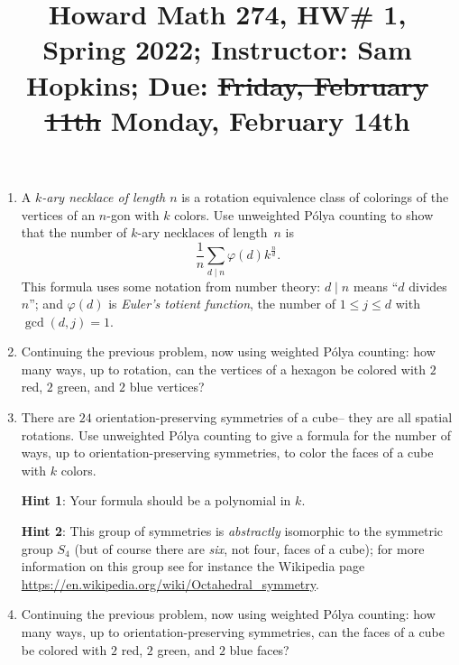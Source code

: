 \documentclass[11pt]{article}
\title{Howard Math 274, HW\# 1, \\ {\normalsize Spring 2022; Instructor: Sam Hopkins; Due: \st{Friday, February 11th} Monday, February 14th}}
\date{}
\begin{document}
\maketitle

\thispagestyle{empty}

\vspace{-1.5cm}

\begin{enumerate}

\item A \emph{$k$-ary necklace of length $n$} is a rotation equivalence class of colorings of the vertices of an $n$-gon with $k$ colors. Use unweighted P\'{o}lya counting to show that the number of $k$-ary necklaces of length~$n$ is
\[ \frac{1}{n}\sum_{d\mid n} \varphi(d) k^{\frac{n}{d}}.\]
This formula uses some notation from number theory: $d \mid n$ means ``$d$ divides $n$''; and $\varphi(d)$ is \emph{Euler's totient function}, the number of $1 \leq j \leq d$ with $\gcd(d,j)=1$.

\item Continuing the previous problem, now using weighted P\'{o}lya counting: how many ways, up to rotation, can the vertices of a hexagon be colored with $2$ red, $2$ green, and $2$ blue vertices?

\item There are $24$ orientation-preserving symmetries of a cube-- they are all spatial rotations. Use unweighted P\'{o}lya counting to give a formula for the number of ways, up to orientation-preserving symmetries, to color the faces of a cube with $k$ colors. 

{\bf Hint 1}: Your formula should be a polynomial in $k$.

{\bf Hint 2}: This group of symmetries is \emph{abstractly} isomorphic to the symmetric group $S_4$ (but of course there are \emph{six}, not four, faces of a cube); for more information on this group see for instance the Wikipedia page \url{https://en.wikipedia.org/wiki/Octahedral_symmetry}.

\item Continuing the previous problem, now using weighted P\'{o}lya counting: how many ways, up to orientation-preserving symmetries, can the faces of a cube be colored with $2$ red, $2$ green, and $2$ blue faces?


\end{enumerate}
\end{document}
